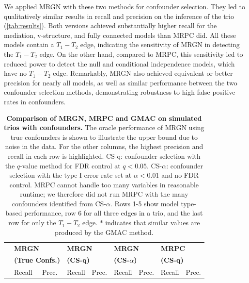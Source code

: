 \documentclass[12pt,letterpaper]{report}
\begin{document}
\begin{doublespace}
We applied MRGN with these two methods for confounder selection.  They led to qualitatively similar results in recall and precision on the inference of the trio (\autoref{tab:results}).  Both versions achieved substantially higher recall for the mediation, v-structure, and fully connected models than MRPC did. All these models contain a $T_1 - T_2$ edge, indicating the sensitivity of MRGN in detecting the $T_1 - T_2$ edge. On the other hand, compared to MRPC, this sensitivity led to reduced power to detect the null and conditional independence models, which have no $T_1 - T_2$ edge. Remarkably, MRGN also achieved equivalent or better precision for nearly all models, as well as similar performance between the two confounder selection methods, demonstrating robustness to high false positive rates in confounders.

\begin{table}[H]
	\caption{\textbf{Comparison of MRGN, MRPC and GMAC on simulated trios with confounders.} The oracle performance of MRGN using true confounders is shown to illustrate the upper bound due to noise in the data.  For the other columns, the highest precision and recall in each row is highlighted.  CS-q: confounder selection with the $q$-value method for FDR control at $q < 0.05$.  CS-$\alpha$: confounder selection with the type I error rate set at $\alpha < 0.01$ and no FDR control.  MRPC cannot handle too many variables in reasonable runtime; we therefore did not run MRPC with the many confounders identified from CS-$\alpha$. Rows 1-5 show model type-based performance, row 6 for all three edges in a trio, and the last row  for only the $T_1-T_2$ edge.  $\ast$ indicates that similar values are produced by the GMAC method.}
	\renewcommand{\arraystretch}{0.9} %
	\begin{tabular}{l|ll|ll|ll|ll}
		\toprule
		 & \multicolumn{2}{p{2.8cm}|}{\centering \bf MRGN} &  \multicolumn{2}{p{2.8cm}|}{\centering \bf MRGN} & 
		\multicolumn{2}{p{2.8cm}|}{\centering \bf MRGN} & 
		\multicolumn{2}{p{2.8cm}}{\centering \bf MRPC} \\
		 & \multicolumn{2}{p{2.8cm}|}{\centering \bf (True Confs.)} &  \multicolumn{2}{p{2.8cm}|}{\centering \bf (CS-q)} & 
		\multicolumn{2}{p{2.8cm}|}{\centering \bf (CS-$\alpha$)} & 
		\multicolumn{2}{p{2.8cm}}{\centering \bf (CS-q)} \\		
		& Recall & Prec. & Recall & Prec. & Recall & Prec. & Recall & Prec. \\ 

\end{tabular}
\end{table}
\end{doublespace}
\end{document}
